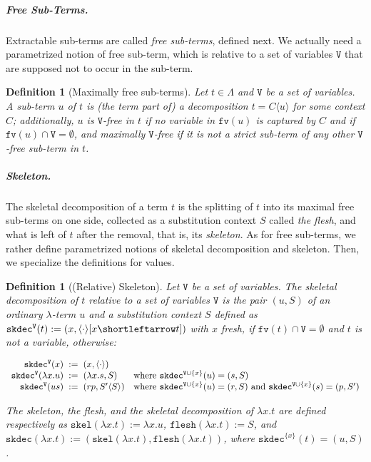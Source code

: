 \documentclass[10pt,a4paper]{article}
\newtheorem{definition}[theorem]{Definition}
\theoremstyle{remark}
\newcommand{\lterms}{\Lambda}
\newcommand{\la}[1]{\lambda #1.}
\newcommand{\tm}{t}
\newcommand{\tmtwo}{u}
\newcommand{\tmthree}{s}
\newcommand{\tmfour}{r}
\newcommand{\tmfive}{p}
\newcommand{\var}{x}
\newcommand{\ap}[2]{#1[#2]}
\renewcommand{\ap}[2]{#1#2}
\newcommand{\symfont}[1]{\mathtt{#1}}
\newcommand{\ctxholep}[1]{\langle #1\rangle}
\newcommand{\ctxhole}{\ctxholep{\cdot}}
\newcommand{\ctx}{C}
\newcommand{\ctxp}[1]{\ctx\ctxholep{#1}}
\newcommand{\sctx}{S}
\newcommand{\sctxtwo}{{\sctx'}}
\newcommand{\sctxtwop}[1]{\sctxtwo\ctxholep{#1}}
\newcommand{\defeq}{:=}
\newcommand{\esub}[2]{[#1{\shortleftarrow}#2]}
\renewcommand{\l}{\lambda}
\newcommand{\fv}[1]{\symfont{fv}(#1)}
\newcommand{\set}[1]{\{#1\}}
\newcommand{\skelabs}[1]{\symfont{skel}(#1)}
\newcommand{\skeldec}[2]{\symfont{sk}\symfont{dec}^{#2}(#1)}
\newcommand{\skeldecabs}[1]{\symfont{sk}\symfont{dec}(#1)}
\newcommand{\skelvars}{\theta}
\renewcommand{\skelvars}{\symfont{V}}
\newcommand{\flesh}[1]{\symfont{flesh}(#1)}
\begin{document}
\subparagraph{Free Sub-Terms.} Extractable sub-terms are called \emph{free sub-terms}, defined next. We actually need a parametrized notion of free sub-term, which is relative to a set of variables $\skelvars$ that are supposed not to occur in the sub-term. 

\begin{definition}[Maximally free sub-terms]
Let $\tm \in \lterms$ and $\skelvars$ be a set of variables. A sub-term $\tmtwo$ of $\tm$ is (the term part of) a decomposition $\tm=\ctxp\tmtwo$ for some context $\ctx$; additionally, $\tmtwo$ is \emph{$\skelvars$-free in $\tm$} if no variable in $\fv{\tmtwo}$ is captured by $\ctx$ and if $\fv\tmtwo\cap \skelvars = \emptyset$, and 
\emph{maximally $\skelvars$-free} if it is not a strict sub-term of any other $\skelvars$-free sub-term in $\tm$.
\end{definition}

\subparagraph{Skeleton.} The skeletal decomposition of a term $\tm$ is the splitting of $\tm$ into its maximal free sub-terms on one side, collected as a substitution context $\sctx$ called \emph{the flesh}, and what is left of $\tm$ after the removal, that is, its \emph{skeleton}. As for free sub-terms, we rather define parametrized notions of skeletal decomposition and skeleton. Then, we specialize the definitions for values.

\begin{definition}[(Relative) Skeleton]
Let $\skelvars$ be a set of variables. The skeletal decomposition of $\tm$ relative to a set of variables $\skelvars$ is the pair $(\tmtwo,\sctx)$ of an ordinary $\l$-term $\tmtwo$ and a substitution context $\sctx$ defined as $\skeldec{\tm}{\skelvars}  \defeq  (\var, \ctxhole\esub\var\tm)$ with $\var$ fresh, if $\fv \tm \cap \skelvars = \emptyset$ and $\tm$ is not a variable, otherwise:
  \begin{center}$\begin{array}{r@{\hspace{.2cm}}l@{\hspace{.2cm}}lllllll}
\skeldec{\var}{\skelvars} & \defeq & (\var,\ctxhole) 
\\
\skeldec{\la\var\tmtwo}{\skelvars} & \defeq & (\la{\var}\tmthree,\sctx)
&\text{where }\skeldec{\tmtwo}{\skelvars \cup \set\var} = (\tmthree,\sctx)
\\
\skeldec{\tmtwo\ap\tmthree}{\skelvars} & \defeq & (\tmfour\tmfive, \sctxtwop\sctx)
&\text{where }\skeldec{\tmtwo}{\skelvars \cup \set\var} = (\tmfour,\sctx) \text{ and }\skeldec{\tmthree}{\skelvars \cup \set\var} = (\tmfive,\sctxtwo)
\\
  \end{array}$\end{center}
The skeleton, the flesh, and the skeletal decomposition of $\la\var\tm$ are defined respectively as $\skelabs{\la\var\tm} \defeq \la\var\tmtwo$, $\flesh{\la\var\tm}\defeq\sctx$, and $\skeldecabs{\la\var\tm} \defeq (\skelabs{\la\var\tm},\flesh{\la\var\tm})$, where $\skeldec\tm{\set\var} = (\tmtwo,\sctx)$.
\end{definition}
\end{document}
